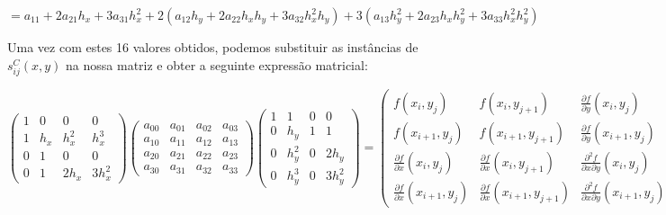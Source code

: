 \documentclass[11pt]{article}
\begin{document}
\begin{enumerate}[label=\textbf{\arabic*)}]
\begin{flushleft}
    $= a_{11} + 2a_{21}h_x + 3a_{31}h_x^2 + 2(a_{12}h_y + 2a_{22}h_xh_y + 3a_{32}h_x^2h_y) + 3(a_{13}h_y^2 + 2a_{23}h_xh_y^2 + 3a_{33}h_x^2h_y^2)$
    \end{flushleft}

  \end{enumerate}

  Uma vez com estes 16 valores obtidos, podemos substituir as instâncias de $s_{ij}^C(x, y)$ na nossa matriz e obter a seguinte expressão matricial: \newline

  \hspace*{-2.5cm}
  {\footnotesize
  $\begin{pmatrix}
    1  & 0   & 0     & 0     \\
    1  & h_x & h_x^2 & h_x^3 \\
    0  & 1   & 0     & 0     \\
    0  & 1   & 2h_x  & 3h_x^2
  \end{pmatrix}
  \begin{pmatrix}
    a_{00}  & a_{01} & a_{02} & a_{03} \\
    a_{10}  & a_{11} & a_{12} & a_{13} \\
    a_{20}  & a_{21} & a_{22} & a_{23} \\
    a_{30}  & a_{31} & a_{32} & a_{33}
  \end{pmatrix}
  \begin{pmatrix}
    1  & 1     & 0 & 0 \\
    0  & h_y   & 1 & 1 \\
    0  & h_y^2 & 0 & 2h_y \\
    0  & h_y^3 & 0 & 3h_y^2
  \end{pmatrix} =
  \begin{pmatrix}
    f(x_i, y_j)                                   & f(x_i, y_{j + 1})                                   & \frac{\partial f}{\partial y}(x_i, y_j)                    & \frac{\partial f}{\partial y}(x_i, y_{j + 1}) \\
    f(x_{i + 1}, y_j)                             & f(x_{i + 1}, y_{j + 1})                             & \frac{\partial f}{\partial y}(x_{i + 1}, y_j)              & \frac{\partial f}{\partial y}(x_{i + 1}, y_{j + 1}) \\
    \frac{\partial f}{\partial x}(x_i, y_j)       & \frac{\partial f}{\partial x}(x_i, y_{j + 1})       & \frac{\partial^2 f}{\partial x \partial y}(x_i, y_j)       & \frac{\partial^2 f}{\partial x \partial y}(x_i, y_{j + 1}) \\
    \frac{\partial f}{\partial x}(x_{i + 1}, y_j) & \frac{\partial f}{\partial x}(x_{i + 1}, y_{j + 1}) & \frac{\partial^2 f}{\partial x \partial y}(x_{i + 1}, y_j) & \frac{\partial^2 f}{\partial x \partial y}(x_{i + 1}, y_{j + 1})
  \end{pmatrix}$}\newline
\end{document}
